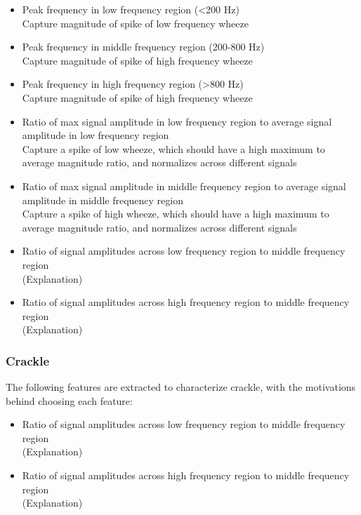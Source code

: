 \documentclass{article}
\begin{document}
\begin{itemize}
\item
	Peak frequency in low frequency region (<200 Hz)\\
	Capture magnitude of spike of low frequency wheeze\\
\item
	Peak frequency in middle frequency region (200-800 Hz)\\
	Capture magnitude of spike of high frequency wheeze\\
\item
	Peak frequency in high frequency region (>800 Hz)\\
	Capture magnitude of spike of high frequency wheeze\\
\item
	Ratio of max signal amplitude in low frequency region to average signal amplitude in low frequency region\\
	Capture a spike of low wheeze, which should have a high maximum to average magnitude ratio, and normalizes across different signals\\
\item
	Ratio of max signal amplitude in middle frequency region to average signal amplitude in middle frequency region\\
	Capture a spike of high wheeze, which should have a high maximum to average magnitude ratio, and normalizes across different signals\\
\item
	Ratio of signal amplitudes across low frequency region to middle frequency region\\
	(Explanation)\\
\item
	Ratio of signal amplitudes across high frequency region to middle frequency region\\
	(Explanation)\\
\end{itemize}

\subsubsection{Crackle}

The following features are extracted to characterize crackle, with the motivations behind choosing each feature: \\

\begin{itemize}
\item
	Ratio of signal amplitudes across low frequency region to middle frequency region\\
	(Explanation)\\
\item
	Ratio of signal amplitudes across high frequency region to middle frequency region\\
	(Explanation)\\
\end{itemize}
\end{document}
